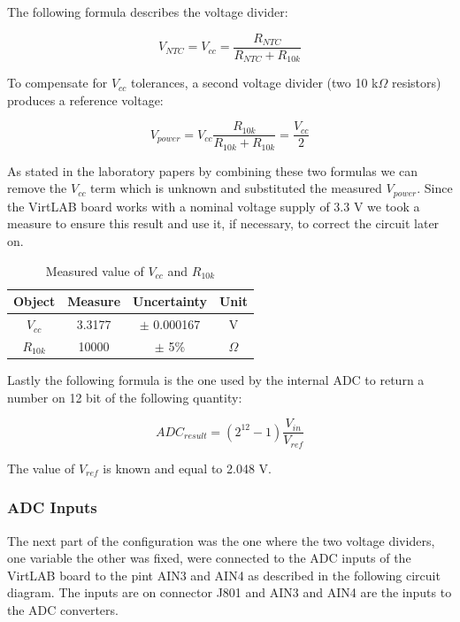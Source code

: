 \documentclass[../main.tex]{subfiles}
\begin{document}
The following formula describes the voltage divider:

\begin{equation*}
	V_{NTC} = V_{cc} = \frac{R_{NTC}}{R_{NTC} + R_{10k}} 
\end{equation*}

To compensate for $V_{cc}$ tolerances, a second voltage divider (two 10 k$\Omega$ resistors) produces a reference voltage:

\begin{equation*}
	V_{power} = V_{cc} \frac{R_{10k}}{R_{10k} + R_{10k}} = \frac{V_{cc}}{2}
\end{equation*}

As stated in the laboratory papers by combining these two formulas we can remove the $V_{cc}$ term which is unknown and substituted the measured $V_{power}$.
Since the VirtLAB board works with a nominal voltage supply of 3.3 V we took a measure to ensure this result and use it, if necessary, to correct the circuit later on.\\

\begin{table}[h!]
\centering	

\begin{tabular}{cccc}
\textbf{Object} & \textbf{Measure} & \textbf{Uncertainty} & \textbf{Unit}\\
\hline
$V_{cc}$ & 3.3177 & $\pm$ 0.000167 & V \\ 
\hline
$R_{10k}$ & 10000 & $\pm$ 5\% & $\Omega$ \\

\end{tabular}
\caption*{Measured value of $V_{cc}$ and $R_{10k}$}
\end{table}

\newpage

Lastly the following formula is the one used by the internal ADC to return a number on 12 bit of the following quantity:

\begin{equation}
	ADC_{result} = (2^{12} -1 ) \frac{V_{in}}{V_{ref}}
\end{equation}

The value of $V_{ref}$ is known and equal to 2.048 V.

\subsubsection*{ADC Inputs}

The next part of the configuration was the one where the two voltage dividers, one variable the other was fixed, were connected to the ADC inputs of the VirtLAB board to the pint AIN3 and AIN4 as described in the following circuit diagram. The inputs are on connector J801 and AIN3 and AIN4 are the inputs to the ADC converters.\\
\end{document}
